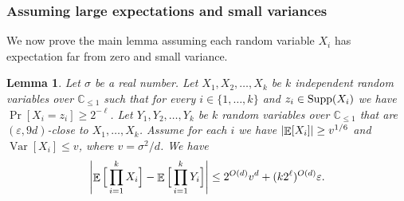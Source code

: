 \documentclass[11pt]{article}
\numberwithin{equation}{section}
\newtheorem{lemma}[theorem]{Lemma}
\theoremstyle{definition}
\theoremstyle{plain}
\newcommand{\C}{\mathbb C}
\def\eps{\varepsilon}
\def\Blocklength{\ell}
\def\Supp{\textnormal{Supp}}
\DeclarePairedDelimiter{\abs}{\lvert}{\rvert}
\DeclareMathOperator*{\E}{\mathbb{E}}                 %
\DeclareMathOperator*{\Var}{Var}                 %
\begin{document}
  \subsubsection{Assuming large expectations and small variances}
  We now prove the main lemma assuming each random variable $X_i$ has expectation far from zero and small variance.
  \begin{lemma} \label{lemma-GKM2}
    Let $\sigma$ be a real number.
    Let $X_1, X_2, \ldots, X_k$ be $k$ independent random variables over $\C_{\le 1}$ such that for every $i \in \{1, \ldots, k\}$ and $z_i \in \Supp(X_i)$ we have $\Pr[X_i = z_i] \ge 2^{-\Blocklength}$.
    Let $Y_1, Y_2, \ldots, Y_k$ be $k$ random variables over $\C_{\le 1}$ that are $(\eps, 9d)$-close to $X_1, \ldots, X_k$.
    Assume for each $i$ we have $\abs{\E[X_i]} \ge v^{1/6}$ and $\Var[X_i] \le v$, where $v = \sigma^2/d$.
    We have
    \[
      \abs*{ \E \Big[ \prod_{i = 1}^k X_i \Big] - \E \Big[ \prod_{i = 1}^k Y_i \Big] }
      \le 2^{O(d)} v^d + (k 2^\Blocklength)^{O(d)} \eps .
    \]
  \end{lemma}
\end{document}
